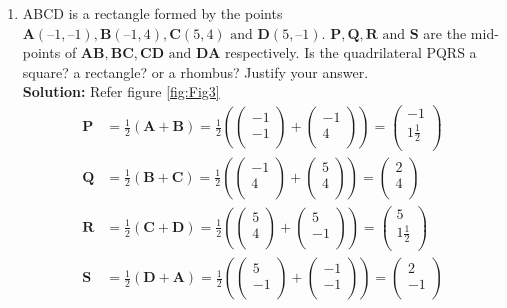 \documentclass[12pt]{article}
\providecommand{\brak}[1]{\ensuremath{\left(#1\right)}}
\newcommand{\solution}{\noindent \textbf{Solution: }}
\newcommand{\myvec}[1]{\ensuremath{\begin{pmatrix}#1\end{pmatrix}}}
\let\vec\mathbf
\begin{document}
\begin{enumerate}
\item ABCD is a rectangle formed by the points $\vec{A}(–1, –1), \vec{B}(– 1, 4), \vec{ C}(5, 4) \text{ and } \vec{D}(5, – 1)$. $\vec{P,Q,R} \text{ and } \vec{S}$ are the mid-points of $\vec{AB, BC, CD} \text{ and } \vec{DA}$ respectively. Is the quadrilateral
PQRS a square? a rectangle? or a rhombus? Justify your answer. \\
\solution 
Refer figure \ref{fig:Fig3}
\begin{align}
  \label{eq:det2f}
  \vec{P} &= \frac{1}{2}\brak{\vec{A}+\vec{B}} =   \frac{1}{2}\brak{\myvec{
  -1 \\
  -1 \\
 } + \myvec{
  -1 \\
  4 \\
 } 
 } = \myvec{
 -1 \\
 1\frac{1}{2} \\
 }   \\
 \vec{Q} &= \frac{1}{2}\brak{\vec{B}+\vec{C}} =   \frac{1}{2}\brak{\myvec{
  -1 \\
  4 \\
 } + \myvec{
  5 \\
  4 \\
 } 
 } = \myvec{
 2 \\
 4 \\
 }   \\
 \vec{R} &= \frac{1}{2}\brak{\vec{C}+\vec{D}} =   \frac{1}{2}\brak{\myvec{
  5 \\
  4 \\
 } + \myvec{
  5 \\
  -1\\
 } 
 } = \myvec{
 5 \\
 1\frac{1}{2} \\
 }   \\
 \vec{S} &= \frac{1}{2}\brak{\vec{D}+\vec{A}} =   \frac{1}{2}\brak{\myvec{
  5 \\
  -1 \\
 } + \myvec{
  -1 \\
  -1\\
 } 
 } = \myvec{
 2\\
 -1 \\
 }   \\
\end{align}


\end{enumerate}
\end{document}
